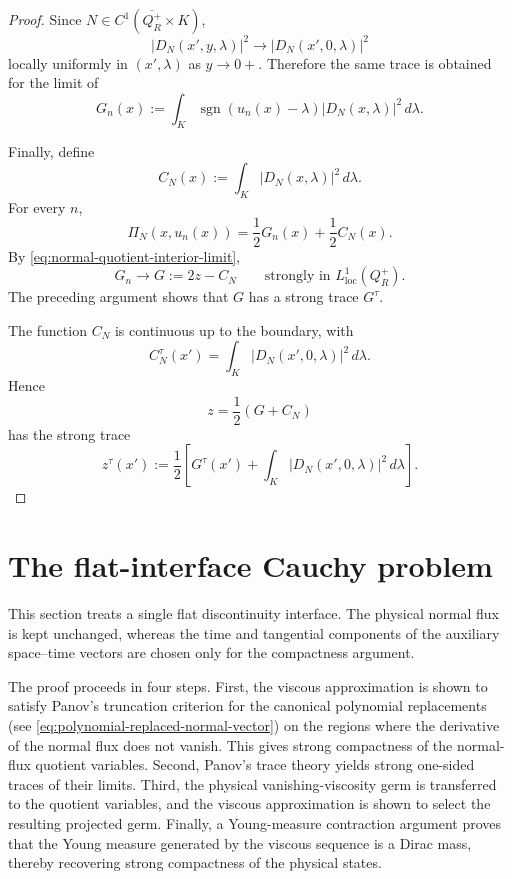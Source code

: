 \documentclass[11pt]{amsart}
\numberwithin{equation}{section}
\theoremstyle{plain}
\theoremstyle{definition}
\theoremstyle{remark}
\begin{document}
\begin{proof}
Since \(N\in C^1(\overline{Q_R^+}\times K)\),
\[
    |D_N(x',y,\lambda)|^2
    \longrightarrow
    |D_N(x',0,\lambda)|^2
\]
locally uniformly in \((x',\lambda)\) as \(y\to0+\).  Therefore the same
trace is obtained for the limit of
\[
    G_n(x)
    :=
    \int_K
        \operatorname{sgn}(u_n(x)-\lambda)
        |D_N(x,\lambda)|^2\,d\lambda.
\]

Finally, define
\[
    C_N(x)
    :=
    \int_K
        |D_N(x,\lambda)|^2\,d\lambda.
\]
For every \(n\),
\begin{equation}
\label{eq:normal-quotient-average-trace-identity}
    \Pi_N(x,u_n(x))
    =
    \frac12G_n(x)
    +
    \frac12C_N(x).
\end{equation}
By \eqref{eq:normal-quotient-interior-limit},
\[
    G_n
    \longrightarrow
    G:=2z-C_N
    \qquad
    \text{strongly in }L^1_{\mathrm{loc}}(Q_R^+).
\]
The preceding argument shows that \(G\) has a strong trace \(G^\tau\).

The function \(C_N\) is continuous up to the boundary, with
\[
    C_N^\tau(x')
    =
    \int_K
        |D_N(x',0,\lambda)|^2\,d\lambda.
\]
Hence
\[
    z
    =
    \frac12(G+C_N)
\]
has the strong trace
\begin{equation}
\label{eq:normal-quotient-trace-formula}
    z^\tau(x')
    :=
    \frac12
    \left[
        G^\tau(x')
        +
        \int_K
            |D_N(x',0,\lambda)|^2\,d\lambda
    \right].
\end{equation}
\end{proof}

\section{The flat-interface Cauchy problem}
\label{sec:flat-interface}

This section treats a single flat discontinuity interface. The physical
normal flux is kept unchanged, whereas the time and tangential components of
the auxiliary space--time vectors are chosen only for the compactness
argument.

The proof proceeds in four steps. First, the viscous approximation is shown
to satisfy Panov's truncation criterion for the canonical polynomial
replacements (see \eqref{eq:polynomial-replaced-normal-vector}) on the regions where the derivative of the normal flux does not
vanish. This gives strong compactness of the normal-flux quotient variables.
Second, Panov's trace theory yields strong one-sided traces of their limits.
Third, the physical vanishing-viscosity germ is transferred to the quotient
variables, and the viscous approximation is shown to select the resulting
projected germ. Finally, a Young-measure contraction argument proves that the
Young measure generated by the viscous sequence is a Dirac mass, thereby
recovering strong compactness of the physical states.
\end{document}
